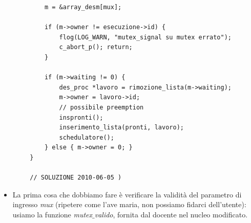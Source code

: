 \begin{itemize}
\begin{verbatim}
			m = &array_desm[mux];
			
			if (m->owner != esecuzione->id) {
				flog(LOG_WARN, "mutex_signal su mutex errato");
				c_abort_p(); return;
			}
			
			if (m->waiting != 0) {
				des_proc *lavoro = rimozione_lista(m->waiting);
				m->owner = lavoro->id;
				// possibile preemption
				inspronti();
				inserimento_lista(pronti, lavoro);
				schedulatore();
			} else { m->owner = 0; }
		}
		
		// SOLUZIONE 2010-06-05 )
	\end{verbatim}
	\begin{itemize}
		\item La prima cosa che dobbiamo fare è verificare la validità del parametro di ingresso \emph{mux} (ripetere come l'ave maria, non possiamo fidarci dell'utente): usiamo la funzione \emph{mutex$\_$valido}, fornita dal docente nel nucleo modificato.
		

\end{itemize}
\end{itemize}
